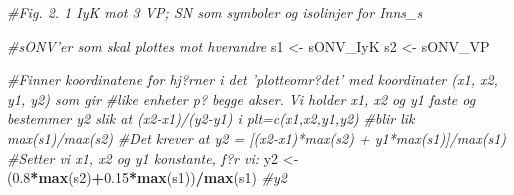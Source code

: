 \documentclass[]{article}
\newenvironment{Shaded}{\begin{snugshade}}{\end{snugshade}}
\newcommand{\CommentTok}[1]{\textcolor[rgb]{0.56,0.35,0.01}{\textit{#1}}}
\newcommand{\FloatTok}[1]{\textcolor[rgb]{0.00,0.00,0.81}{#1}}
\newcommand{\KeywordTok}[1]{\textcolor[rgb]{0.13,0.29,0.53}{\textbf{#1}}}
\newcommand{\NormalTok}[1]{#1}
\newcommand{\OperatorTok}[1]{\textcolor[rgb]{0.81,0.36,0.00}{\textbf{#1}}}
\newcommand{\StringTok}[1]{\textcolor[rgb]{0.31,0.60,0.02}{#1}}
\begin{document}
\begin{Shaded}
\begin{Highlighting}[]
\CommentTok{#Fig. 2. 1 IyK mot 3 VP; SN som symboler og isolinjer for Inns_s}

\CommentTok{#sONV'er som skal plottes mot hverandre}
\NormalTok{s1 <-}\StringTok{ }\NormalTok{sONV_IyK}
\NormalTok{s2 <-}\StringTok{ }\NormalTok{sONV_VP}

\CommentTok{#Finner koordinatene for hj?rner i det 'plotteomr?det' med koordinater (x1, x2, y1, y2) som gir}
\CommentTok{#like enheter p? begge akser. Vi holder x1, x2 og y1 faste og bestemmer y2 slik at (x2-x1)/(y2-y1) i plt=c(x1,x2,y1,y2)}
\CommentTok{#blir lik max(s1)/max(s2)}
\CommentTok{#Det krever at y2 = [(x2-x1)*max(s2) + y1*max(s1)]/max(s1) }
\CommentTok{#Setter vi x1, x2 og y1 konstante, f?r vi:}
\NormalTok{y2 <-}\StringTok{ }\NormalTok{(}\FloatTok{0.8}\OperatorTok{*}\KeywordTok{max}\NormalTok{(s2)}\OperatorTok{+}\FloatTok{0.15}\OperatorTok{*}\KeywordTok{max}\NormalTok{(s1))}\OperatorTok{/}\KeywordTok{max}\NormalTok{(s1)}
\CommentTok{#y2}


\end{Highlighting}
\end{Shaded}
\end{document}
